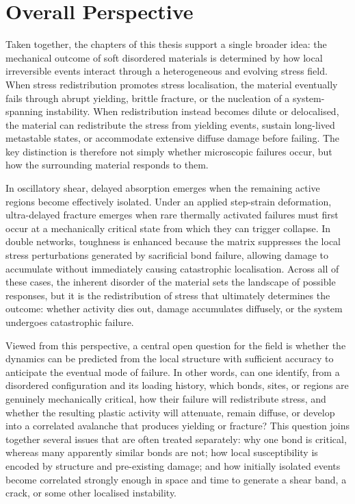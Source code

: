 \documentclass[asymmetricmargins]{library/duthesis}%
\begin{document}
\section{Overall Perspective}
Taken together, the chapters of this thesis support a single broader idea: the mechanical outcome of soft disordered materials is determined by how local irreversible events interact through a heterogeneous and evolving stress field. When stress redistribution promotes stress localisation, the material eventually fails through abrupt yielding, brittle fracture, or the nucleation of a system-spanning instability. When redistribution instead becomes dilute or delocalised, the material can redistribute the stress from yielding events, sustain long-lived metastable states, or accommodate extensive diffuse damage before failing. The key distinction is therefore not simply whether microscopic failures occur, but how the surrounding material responds to them.

In oscillatory shear, delayed absorption emerges when the remaining active regions become effectively isolated. Under an applied step-strain deformation, ultra-delayed fracture emerges when rare thermally activated failures must first occur at a mechanically critical state from which they can trigger collapse. In double networks, toughness is enhanced because the matrix suppresses the local stress perturbations generated by sacrificial bond failure, allowing damage to accumulate without immediately causing catastrophic localisation. Across all of these cases, the inherent disorder of the material sets the landscape of possible responses, but it is the redistribution of stress that ultimately determines the outcome: whether activity dies out, damage accumulates diffusely, or the system undergoes catastrophic failure.

Viewed from this perspective, a central open question for the field is whether the dynamics can be predicted from the local structure with sufficient accuracy to anticipate the eventual mode of failure. In other words, can one identify, from a disordered configuration and its loading history, which bonds, sites, or regions are genuinely mechanically critical, how their failure will redistribute stress, and whether the resulting plastic activity will attenuate, remain diffuse, or develop into a correlated avalanche that produces yielding or fracture? This question joins together several issues that are often treated separately: why one bond is critical, whereas many apparently similar bonds are not; how local susceptibility is encoded by structure and pre-existing damage; and how initially isolated events become correlated strongly enough in space and time to generate a shear band, a crack, or some other localised instability. 
\end{document}
